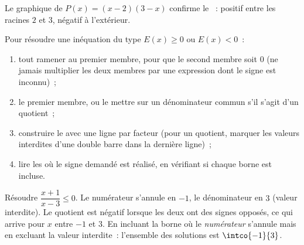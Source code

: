 \begin{omfigure}

{\small Le graphique de $P(x) = (x-2)(3-x)$ confirme le ~: positif entre les racines $2$ et $3$, négatif à l'extérieur.}
\end{omfigure}

\begin{method}\label{met:g10:algebra:signtable}
Pour résoudre une inéquation du type $E(x) \geq 0$ ou $E(x) < 0$~:
\begin{enumerate}
  \item tout ramener au premier membre, pour que le second membre soit
        $0$ (ne jamais multiplier les deux membres par une expression dont
        le signe est inconnu)~;
  \item {} le premier membre, ou le mettre sur un dénominateur
        commun s'il s'agit d'un quotient~;
  \item construire le  avec une ligne par facteur (pour
        un quotient, marquer les valeurs interdites d'une double barre
        dans la dernière ligne)~;
  \item lire les  où le signe demandé est réalisé, en
        vérifiant si chaque borne est incluse.
\end{enumerate}
\end{method}

\begin{example}\label{ex:g10:algebra:quotientineq}
Résoudre $\dfrac{x + 1}{x - 3} \leq 0$. Le numérateur s'annule en $-1$, le
dénominateur en $3$ (valeur interdite). Le quotient est négatif lorsque
les deux ont des signes opposés, ce qui arrive pour $x$ entre $-1$ et $3$.
En incluant la borne où le \emph{numérateur} s'annule mais en excluant la
valeur interdite~: l'ensemble des solutions est $\intco{-1}{3}$.
\end{example}

